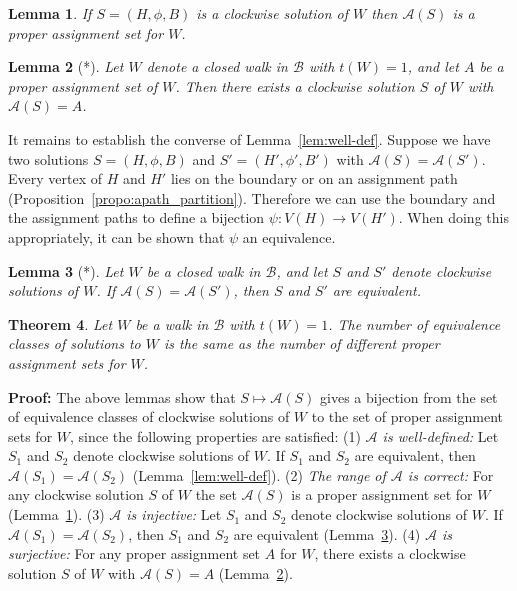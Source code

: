 \documentclass{llncs}
\newcommand{\PF}{{\bf Proof: }}
\newcommand{\QED}{\hspace*{\fill}{$\Box$}\medskip}
\newcommand{\BW}{\mathcal{B}}
\newcommand{\AS}{\mathcal{A}}
\newtheorem{thm}{Theorem}
\newtheorem{lem}[thm]{Lemma}
\begin{document}
\begin{lem}
\label{lem:necessary}
If $S=(H,\phi,B)$ is a clockwise solution of $W$ then $\AS(S)$ is a
proper assignment set for $W$.
\end{lem}

\begin{lem}[*]
\label{lem:surjective}
Let $W$ denote a closed walk in $\BW$ with $t(W)=1$, and let $A$ be a proper assignment set of $W$. Then there exists a clockwise solution $S$ of $W$ with $\AS(S)=A$.
\end{lem}


It remains to establish the converse of Lemma~\ref{lem:well-def}.
Suppose we have two solutions $S=(H,\phi,B)$ and $S'=(H',\phi',B')$ with $\AS(S)=\AS(S')$.
Every vertex of $H$ and $H'$ lies on the boundary or on an assignment path (Proposition~\ref{propo:apath_partition}).
Therefore we can use the boundary and the assignment paths to define a bijection $\psi:V(H)\rightarrow V(H')$. When doing this appropriately, it can be shown that $\psi$ an equivalence. 

\begin{lem}[*]
\label{lem:injective}
Let $W$ be a closed walk in $\BW$, and let $S$ and $S'$ denote clockwise solutions of $W$. If $\AS(S)=\AS(S')$, then $S$ and $S'$ are equivalent.
\end{lem}




\begin{thm}
\label{thm:equivalence}
Let $W$ be a walk in $\BW$ with $t(W)=1$. The number of equivalence classes of solutions to $W$ is the same as the number of different proper assignment sets for $W$.
\end{thm}
\PF
The above lemmas show that $S\mapsto \AS(S)$ gives a bijection from
the set of equivalence classes of clockwise solutions of $W$
to the set of proper assignment sets for $W$, since the following properties are satisfied:
(1) \emph{$\AS$ is well-defined:} Let $S_1$ and $S_2$ denote clockwise solutions of $W$. If $S_1$ and $S_2$ are equivalent, then $\AS(S_1)=\AS(S_2)$ (Lemma~\ref{lem:well-def}).
(2) \emph{The range of $\AS$ is correct:} For any clockwise solution $S$ of $W$ the set $\AS(S)$ is a proper assignment set for $W$ (Lemma~\ref{lem:necessary}).
(3) \emph{$\AS$ is injective:}  Let $S_1$ and $S_2$ denote clockwise solutions of $W$. If $\AS(S_1)=\AS(S_2)$, then $S_1$ and $S_2$ are equivalent (Lemma~\ref{lem:injective}).
(4) \emph{$\AS$ is surjective:} For any proper assignment set $A$ for $W$, there exists a clockwise solution $S$ of $W$ with $\AS(S)=A$ (Lemma~\ref{lem:surjective}).
\QED
\end{document}

